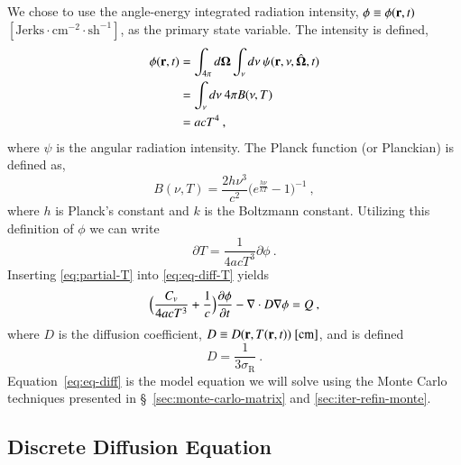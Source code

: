 \documentclass[preprint,12pt]{elsarticle}
\newcommand{\Cv}{\ensuremath{C_{v}}}
\newcommand{\ros}{\ensuremath{\sigma_{\scriptscriptstyle\mathrm{R}}}}
\newcommand{\bOmega}{\ensuremath{\mathbf{\Omega}}}
\begin{document}
We chose to use the angle-energy integrated radiation intensity,
$\phi\equiv\phi(\mathbf{r},t)$
$[\text{Jerks}\cdot\text{cm}^{-2}\cdot\text{sh}^{-1}]$, as the primary
state variable.  The intensity is defined,
\begin{equation}
  \label{eq:lte-phi}
  \begin{split}
    \phi(\ve{r},t) &=
    \int_{4\pi}d\bOmega\int_{\nu}d\nu\:\psi(\ve{r},\nu,\hat{\bOmega},t) \\
    &= \int_{\nu}d\nu\: 4\pi B(\nu,T) \\
    &= acT^{4}\:,
  \end{split}
\end{equation}
where $\psi$ is the angular radiation intensity.  The Planck function
(or Planckian) is defined as,
\begin{equation}
  B(\nu,T)=\frac{2h\nu^{3}}{c^{2}}\bigl(e^{\frac{h\nu}{kT}} -
  1\bigr)^{-1}\:,
\end{equation}
where $h$ is Planck's constant and $k$ is the Boltzmann constant.
Utilizing this definition of $\phi$ we can write
\begin{equation}
  \label{eq:partial-T}
  \partial T = \frac{1}{4acT^{3}}\partial\phi\:.
\end{equation}
Inserting \eqref{eq:partial-T} into \eqref{eq:eq-diff-T} yields
\begin{equation}
  \label{eq:eq-diff}
  \Bigl(\frac{\Cv}{4acT^{3}} + \frac{1}{c}\Bigr)\pder{\phi}{t} - 
  \nabla\cdot D\grad{\phi} = Q\:,
\end{equation}
where $D$ is the diffusion coefficient, $D\equiv
D(\mathbf{r},T(\mathbf{r},t))\ [\text{cm}]$, and is defined
\begin{equation}
  D = \frac{1}{3\ros}\:.
\end{equation}
Equation~\eqref{eq:eq-diff} is the model equation we will solve using
the Monte Carlo techniques presented in
\S~\ref{sec:monte-carlo-matrix} and \ref{sec:iter-refin-monte}.

\subsection{Discrete Diffusion Equation}
\end{document}
